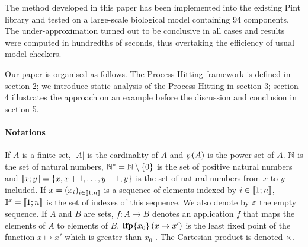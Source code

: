 The method developed in this paper has been implemented into the existing Pint library and tested on a large-scale biological model containing 94 components.
The under-approximation turned out to be conclusive in all cases and results were computed in hundredths of seconds,
thus overtaking the efficiency of usual model-checkers.



Our paper is organised as follows.
The Process Hitting framework is defined in section 2;
we introduce static analysis of the Process Hitting in section 3;
section 4 illustrates the approach on an example
before the discussion and conclusion in section 5. 



\paragraph*{Notations}

If $A$ is a finite set,
$|A|$ is the cardinality of $A$
and $\wp(A)$ is the power set of $A$.
$\mathbb{N}$ is the set of natural numbers,
$\mathbb{N}^* = \mathbb{N} \setminus \{ 0 \}$ is the set of positive natural numbers
and $\llbracket x; y \rrbracket = \{ x, x+1, \dots, y-1, y \}$ is the set of natural numbers from $x$ to $y$ included.
If $x = (x_i)_{i \in \llbracket 1; n \rrbracket}$ is a sequence of elements indexed by $i \in \llbracket 1; n \rrbracket$,
$\mathbb{I}^{x} = \llbracket 1; n \rrbracket$ is the set of indexes of this sequence.
We also denote by $\varepsilon$ the empty sequence.
If $A$ and $B$ are sets,
$f : A \rightarrow B$ denotes an application $f$ that maps the elements of $A$ to elements of $B$.
$\mathbf{lfp}\{x_0\}\left(x\mapsto x'\right)$ is the least fixed point of the function $x \mapsto x'$ which is greater than $x_0$ .
The Cartesian product is denoted $\times$.
